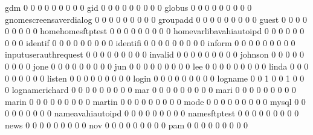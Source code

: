 \documentclass[compress,8pt]{beamer}
\begin{document}
\begin{frame}
\begin{Schunk}
  gdm                                        0   0   0   0   0   0   0   0   0
  gid                                        0   0   0   0   0   0   0   0   0
  globus                                     0   0   0   0   0   0   0   0   0
  gnomescreensaverdialog                     0   0   0   0   0   0   0   0   0
  groupadd                                   0   0   0   0   0   0   0   0   0
  guest                                      0   0   0   0   0   0   0   0   0
  homehomesftptest                           0   0   0   0   0   0   0   0   0
  homevarlibavahiautoipd                     0   0   0   0   0   0   0   0   0
  identif                                    0   0   0   0   0   0   0   0   0
  identifi                                   0   0   0   0   0   0   0   0   0
  inform                                     0   0   0   0   0   0   0   0   0
  inputuserauthrequest                       0   0   0   0   0   0   0   0   0
  invalid                                    0   0   0   0   0   0   0   0   0
  johnson                                    0   0   0   0   0   0   0   0   0
  jone                                       0   0   0   0   0   0   0   0   0
  jun                                        0   0   0   0   0   0   0   0   0
  lee                                        0   0   0   0   0   0   0   0   0
  linda                                      0   0   0   0   0   0   0   0   0
  listen                                     0   0   0   0   0   0   0   0   0
  login                                      0   0   0   0   0   0   0   0   0
  logname                                    0   0   1   0   0   1   0   0   0
  lognamerichard                             0   0   0   0   0   0   0   0   0
  mar                                        0   0   0   0   0   0   0   0   0
  mari                                       0   0   0   0   0   0   0   0   0
  marin                                      0   0   0   0   0   0   0   0   0
  martin                                     0   0   0   0   0   0   0   0   0
  mode                                       0   0   0   0   0   0   0   0   0
  mysql                                      0   0   0   0   0   0   0   0   0
  nameavahiautoipd                           0   0   0   0   0   0   0   0   0
  namesftptest                               0   0   0   0   0   0   0   0   0
  news                                       0   0   0   0   0   0   0   0   0
  nov                                        0   0   0   0   0   0   0   0   0
  pam                                        0   0   0   0   0   0   0   0   0

\end{Schunk}
\end{frame}
\end{document}
